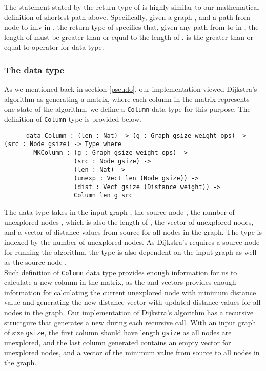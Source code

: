 The statement stated by the return type of  is highly similar to our mathematical definition of shortest path above. Specifically, given a graph , and a path  from node  to inl{v} in , the return type of  specifies that, given any path  from  to  in , the length of  must be greater than or equal to the length of .  is the greater than or equal to operator for  data type. 
\\

\subsubsection{The  data type} \label{column}
As we mentioned back in section \ref{pseudo}, our implementation viewed Dijkstra's algorithm as generating a matrix, where each column in the matrix represents one state of the algorithm, we define a \texttt{Column} data type for this purpose. The definition of \texttt{Column} type is provided below. 

\begin{lstlisting}
      data Column : (len : Nat) -> (g : Graph gsize weight ops) -> (src : Node gsize) -> Type where
        MKColumn : (g : Graph gsize weight ops) ->
                   (src : Node gsize) ->
                   (len : Nat) ->
                   (unexp : Vect len (Node gsize)) ->
                   (dist : Vect gsize (Distance weight)) ->
                   Column len g src

\end{lstlisting}

The  data type takes in the input graph , the source node , the number of unexplored nodes , which is also the length of , the vector of unexplored nodes, and a vector of distance values from source for all nodes in the graph. The  type is indexed by the number of unexplored nodes. As Dijkstra's requires a source node for running the algorithm, the type  is also dependent on the input graph as well as the source node .
\\

Such definition of \texttt{Column} data type provides enough information for us to calculate a new column in the matrix, as the  and  vectors provides enough information for calculating the current unexplored node with minimum distance value and generating the new distance vector with updated distance values for all nodes in the graph. Our implementation of Dijkstra's algorithm has a recursive structgure that generates a new  during each recursive call. With an input graph of size \texttt{gsize}, the first column should have length \texttt{gsize} as all nodes are unexplored, and the last column generated contains an empty vector for unexplored nodes, and a vector of the minimum value from source to all nodes in the graph. 
